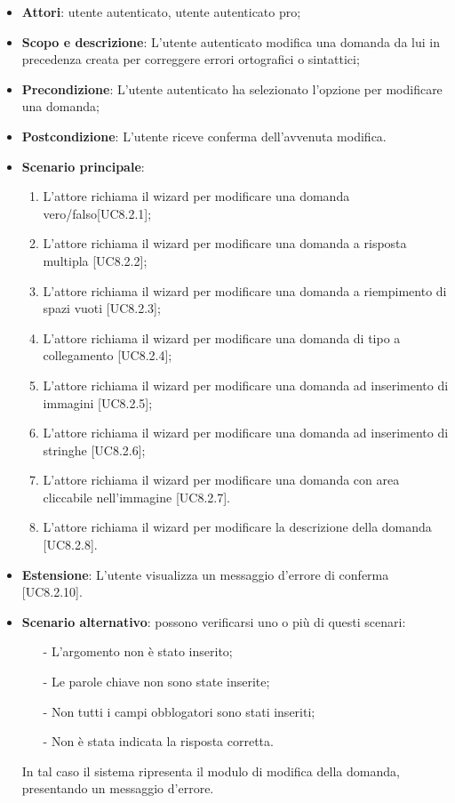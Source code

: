 	\begin{itemize}
		\item
			\textbf{Attori}: utente autenticato, utente autenticato pro;
		\item		
			\textbf{Scopo e descrizione}: L'utente autenticato modifica una domanda da lui in precedenza creata per correggere errori ortografici o sintattici;
		\item
			\textbf{Precondizione}: L'utente autenticato ha selezionato l'opzione per modificare una domanda;
		\item
			\textbf{Postcondizione}: L'utente riceve conferma dell'avvenuta modifica.
		\item
			\textbf{Scenario principale}:
	       		\begin{enumerate}
					\item
					L'attore richiama il wizard per modificare una domanda vero/falso[UC8.2.1];
					\item
					L'attore richiama il wizard per modificare una domanda a risposta multipla [UC8.2.2];
					\item
					L'attore richiama il wizard per modificare una domanda a riempimento di spazi vuoti [UC8.2.3];
					\item
					L'attore richiama il wizard per modificare una domanda di tipo a collegamento [UC8.2.4];
					\item
					L'attore richiama il wizard per modificare una domanda ad inserimento di immagini [UC8.2.5];
					\item
					L'attore richiama il wizard per modificare una domanda ad inserimento di stringhe [UC8.2.6];
					\item
					L'attore richiama il wizard per modificare una domanda con area cliccabile nell'immagine [UC8.2.7].
					\item
					L'attore richiama il wizard per modificare la descrizione della domanda [UC8.2.8].
	 			\end{enumerate}
	 	\item
			\textbf{Estensione}: L'utente visualizza un messaggio d'errore di conferma [UC8.2.10].
	 	\item
	 		\textbf{Scenario alternativo}: possono verificarsi uno o più di questi scenari:
				\begin{itemize}
					\item[-] 	
						L'argomento non è stato inserito;
					\item[-] 
						Le parole chiave non sono state inserite;
					\item[-] 
						Non tutti i campi obblogatori sono stati inseriti; 
					\item[-]
						Non è stata indicata la risposta corretta.	
				\end{itemize}
			In tal caso il sistema ripresenta il modulo di modifica della domanda, presentando un messaggio d'errore.
	\end{itemize}
	
